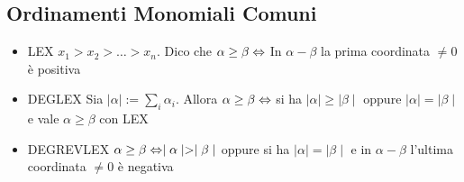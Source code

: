 \documentclass[a4paper,NoNotes,GeneralMath]{stdmdoc}
\begin{document}
	\subsection*{Ordinamenti Monomiali Comuni}
	\begin{itemize}
		\item LEX $x_1 > x_2 > \ldots > x_n$. Dico che $\alpha \ge \beta \Leftrightarrow$ In $\alpha - \beta$ la prima coordinata $\neq 0$ è positiva
		\item DEGLEX Sia $\mid \alpha \mid := \sum_i \alpha_i$. Allora $\alpha \ge \beta \Leftrightarrow$ si ha $\mid \alpha \mid \ge \mid \beta \mid$ oppure $\mid \alpha \mid = \mid \beta \mid$ e vale $\alpha \ge \beta$ con LEX
		\item DEGREVLEX $\alpha \ge \beta \Leftrightarrow \mid \alpha \mid > \mid \beta \mid$ oppure si ha $\mid \alpha \mid = \mid \beta \mid$ e in $\alpha - \beta$ l'ultima coordinata $\neq 0$ è negativa
	\end{itemize}
\end{document}
